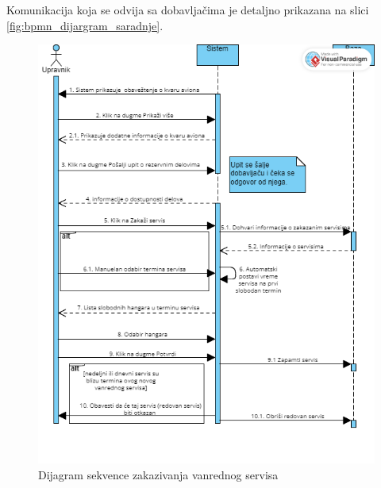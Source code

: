 \documentclass[a4paper]{article}
\begin{document}
Komunikacija koja se odvija sa dobavljačima je detaljno prikazana na slici \ref{fig:bpmn_dijargram_saradnje}.

\begin{figure}[H]
\begin{center}
\includegraphics[scale=0.6, width = 1.0\textwidth]{Dijagrami/Dijagrami_sekvence/Dijagram_sekvence_zakazivanje_vanrednog_servisa.png}
\end{center}
\caption{Dijagram sekvence zakazivanja vanrednog servisa}
\label{fig:ds_zakazivanje_vanrednog_servisa}
\end{figure}
\end{document}
